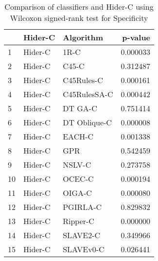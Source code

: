 \begin{table}
\footnotesize
\caption{Comparison of classifiers and Hider-C using Wilcoxon signed-rank test for Specificity}
\label{tab:Hider-C wilcoxon Specificity comparison}
\begin{tabular}{lllr}
\hline
 & Hider-C & Algorithm & p-value \\
\hline
1 & Hider-C & 1R-C & 0.000033 \\
2 & Hider-C & C45-C & 0.312487 \\
3 & Hider-C & C45Rules-C & 0.000161 \\
4 & Hider-C & C45RulesSA-C & 0.000442 \\
5 & Hider-C & DT GA-C & 0.751414 \\
6 & Hider-C & DT Oblique-C & 0.000008 \\
7 & Hider-C & EACH-C & 0.001338 \\
8 & Hider-C & GPR & 0.542459 \\
9 & Hider-C & NSLV-C & 0.273758 \\
10 & Hider-C & OCEC-C & 0.000194 \\
11 & Hider-C & OIGA-C & 0.000080 \\
12 & Hider-C & PGIRLA-C & 0.829832 \\
13 & Hider-C & Ripper-C & 0.000000 \\
14 & Hider-C & SLAVE2-C & 0.349966 \\
15 & Hider-C & SLAVEv0-C & 0.026441 \\
\hline
\end{tabular}
\end{table}
